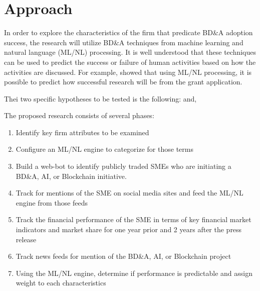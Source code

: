 \section{Approach}

In order to explore the characteristics of the firm that predicate BD\&A adoption success, the research will utilize BD\&A techniques from machine learning and natural language (ML/NL) processing. It is well understood that these techniques can be used to predict the success or failure of human activities based on how the activities are discussed. For example, \textcite{alaphatSmartFundPredictingResearch2020} showed that using ML/NL processing, it is possible to predict how successful research will be from the grant application.

Thei two specific hypotheses to be tested is the following:  and, 

The proposed research consists of several phases:
\begin{enumerate}
  \item Identify key firm attributes to be examined
  \item Configure an ML/NL engine to categorize for those terms
  \item Build a web-bot to identify publicly traded SMEs who are initiating a BD\&A, AI, or Blockchain initiative.
  \item Track for mentions of the SME on social media sites and feed the ML/NL engine from those feeds
  \item Track the financial performance of the SME in terms of key financial market indicators and market share for one year prior and 2 years after the press release
  \item Track news feeds for mention of the BD\&A, AI, or Blockchain project
  \item Using the ML/NL engine, determine if performance is predictable and assign weight to each characteristics
\end{enumerate}



